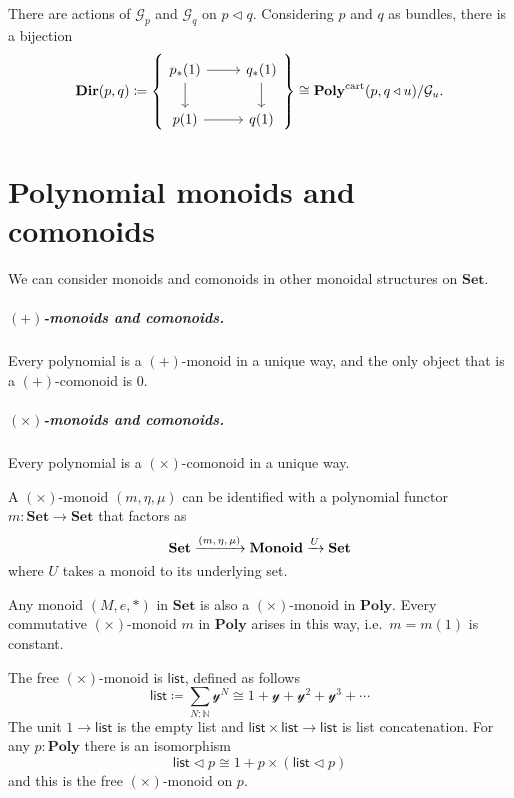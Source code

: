 \documentclass[11pt, one side, article]{memoir}
\theoremstyle{definition}
\theoremstyle{plain}
\newcommand{\cat}[1]{\mathcal{#1}}%
\newcommand{\Cat}[1]{\mathbf{#1}}%
\newcommand{\Fun}[1]{\mathsf{#1}}%
\newcommand{\To}[2][]{\xrightarrow[#1]{\tn{$#2$}}}
\newcommand{\tn}[1]{\textnormal{#1}}
\newcommand{\nn}{\mathbb{N}}
\newcommand{\smset}{\Cat{Set}}
\newcommand{\List}{\Fun{list}}
\newcommand{\yon}{{\mathcal{y}}}
\newcommand{\poly}{\Cat{Poly}}
\newcommand{\cart}{\tn{cart}}
\newcommand{\polycart}{\poly^\cart}
\newcommand{\0}{\textsf{0}}
\newcommand{\1}{\tn{\textsf{1}}}
\newcommand{\tri}{\mathbin{\triangleleft}}
\newcommand{\uu}{\List}
\begin{document}
There are actions of $\cat{G}_p$ and $\cat{G}_q$ on $p\tri q$. Considering $p$ and $q$ as bundles, there is a bijection
\begin{equation}
	\Cat{Dir}(p,q)\coloneqq\left\{
	\begin{tikzcd}[ampersand replacement=\&]
		p_*(1)\ar[r]\ar[d]\&q_*(1)\ar[d]\\
		p(1)\ar[r]\&q(1)
	\end{tikzcd}
	\right\}
	\cong
	\polycart(p,q\tri u)/\cat{G}_u.
\end{equation}


\chapter{Polynomial monoids and comonoids}\label{chap.monoids.comonoids}

We can consider monoids and comonoids in other monoidal structures on $\smset$. 

\paragraph{$(+)$-monoids and comonoids.}
Every polynomial is a $(+)$-monoid in a unique way, and the only object that is a $(+)$-comonoid is $0$.

\paragraph{$(\times)$-monoids and comonoids.}
Every polynomial is a $(\times)$-comonoid in a unique way.

A $(\times)$-monoid $(m,\eta,\mu)$ can be identified with a polynomial functor $m\colon\smset\to\smset$ that factors as
\begin{equation}
	\smset\To{(m,\eta,\mu)}\Cat{Monoid}\To{U}\smset
\end{equation}
where $U$ takes a monoid to its underlying set.

Any monoid $(M,e,*)$ in $\smset$ is also a $(\times)$-monoid in $\poly$. Every commutative $(\times)$-monoid $m$ in $\poly$ arises in this way, i.e.\ $m=m(1)$ is constant.

The free $(\times)$-monoid is $\uu$, defined as follows
\begin{equation}\label{eqn.list}
\uu\coloneqq\sum_{N:\nn}\yon^N\cong 1+\yon+\yon^2+\yon^3+\cdots
\end{equation}
The unit $1\to\uu$ is the empty list and $\uu\times\uu\to\uu$ is list concatenation. For any $p:\poly$ there is an isomorphism
\begin{equation}\label{eqn.unfolding_list}
\uu\tri p\cong 1+p\times(\uu\tri p)
\end{equation}
and this is the free $(\times)$-monoid on $p$.
\end{document}
